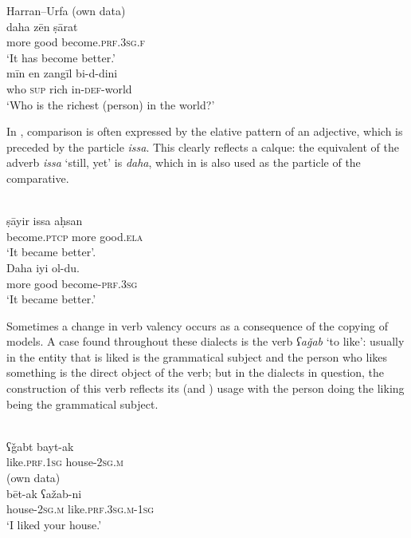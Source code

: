 \documentclass[output=paper]{langsci/langscibook}
\begin{document}
\ea 
{Harran--Urfa (own data)}\\
\gll daha zēn ṣārat\\
     more good become.\textsc{prf.3sg.f}\\
\glt ‘It has become better.’
\ex 
{  \citep[155]{Procházka2002Cukurova}} \\
\gll mīn en zangīl bi-d-dini\\
     who \textsc{sup} rich in-\textsc{def}-world\\
\glt ‘Who is the richest (person) in the world?’ 
\z

In , comparison is often expressed by the {elative} pattern of an adjective, which is preceded by the particle \textit{issa}. This clearly reflects a {calque}: the  equivalent of the adverb \textit{issa} ‘still, yet’ is \textit{daha}, which in  is also used as the particle of the {comparative}. 

\ea 
{  \citep[202]{Procházka2002Cukurova}} \\
\gll ṣāyir issa aḥsan \\
     become.\textsc{ptcp} more good.\textsc{ela}\\
\glt ‘It became better’. 
\ex 
{}\\
\gll Daha iyi ol-du.\\
     more good become-\textsc{prf.3sg}\\
\glt ‘It became better.’
\z

Sometimes a change in verb valency occurs as a consequence of the copying of  models. A case found throughout these dialects is the verb \textit{ʕaǧab} ‘to like’: usually in  the entity that is liked is the grammatical subject and the person who likes something is the direct object of the verb; but in the  dialects in question, the construction of this verb reflects its  (and ) usage with the person doing the liking being the grammatical subject.

\ea 
\ea {} \citep[200]{Procházka2002Cukurova}\\
   \gll ʕǧabt bayt-ak\\
     like.\textsc{prf.1sg} house-\textsc{2sg.m}\\
\ex
  (own data)\\
   \gll bēt-ak ʕažab-ni\\
     house-\textsc{2sg.m} like.\textsc{prf.3sg.m-1sg}\\
\glt ‘I liked your house.’
\z
\z
\end{document}
